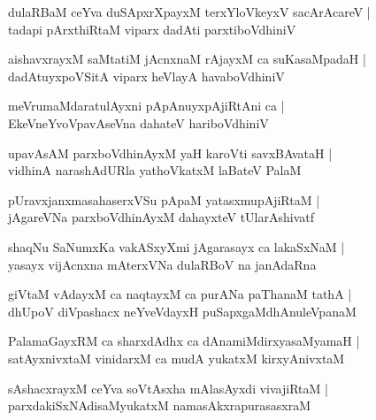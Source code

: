 \documentclass[twoside,12pt,openright]{book}
\newcounter{shloka}[chapter]
\begin{document}
\begin{shloka}%
dulaRBaM ceYva duSApxrXpayxM terxYloVkeyxV sacArAcareV |\\
tadapi pArxthiRtaM viparx dadAti parxtiboVdhiniV 
\end{shloka}

\begin{shloka}%
aishavxrayxM saMtatiM jAcnxnaM rAjayxM ca suKasaMpadaH |\\
dadAtuyxpoVSitA viparx heVlayA havaboVdhiniV 
\end{shloka}

\begin{shloka}%
meVrumaMdaratulAyxni pApAnuyxpAjiRtAni ca |\\
EkeVneYvoVpavAseVna dahateV hariboVdhiniV 
\end{shloka}

\begin{shloka}%
upavAsAM parxboVdhinAyxM yaH karoVti savxBAvataH |\\
vidhinA narashAdURla yathoVkatxM laBateV PalaM
\end{shloka}

\begin{shloka}%
pUravxjanxmasahaserxVSu pApaM yatasxmupAjiRtaM |\\
jAgareVNa parxboVdhinAyxM dahayxteV tUlarAshivatf 
\end{shloka}

\begin{shloka}%
shaqNu SaNumxKa vakASxyXmi jAgarasayx ca lakaSxNaM |\\
yasayx vijAcnxna mAterxVNa dulaRBoV na janAdaRna 
\end{shloka}

\begin{shloka}%
giVtaM vAdayxM ca naqtayxM ca purANa paThanaM tathA |\\
dhUpoV diVpashacx neYveVdayxH puSapxgaMdhAnuleVpanaM 
\end{shloka}

\begin{shloka}%
PalamaGayxRM ca sharxdAdhx ca dAnamiMdirxyasaMyamaH |\\
satAyxnivxtaM vinidarxM ca mudA yukatxM kirxyAnivxtaM 
\end{shloka}

\begin{shloka}%
sAshacxrayxM ceYva soVtAsxha mAlasAyxdi vivajiRtaM |\\
parxdakiSxNAdisaMyukatxM namasAkxrapurasasxraM 
\end{shloka}
\end{document}
